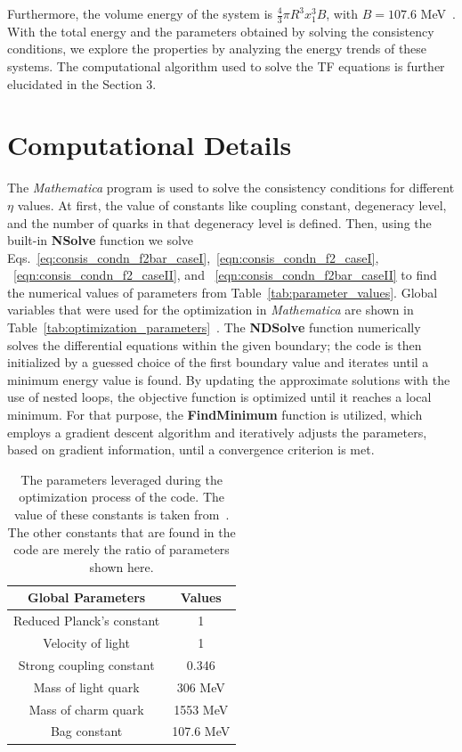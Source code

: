 \documentclass[final,3p,times,twocolumn]{elsarticle}
\begin{document}
        Furthermore, the volume energy of the system is $\frac{4}{3} \pi R^{3} x_{1}^3 B$, with $B = 107.6$ MeV~\cite{Baral:2019qpl}. With the total energy and the parameters obtained by solving the consistency conditions, we explore the properties by analyzing the energy trends of these systems. The computational algorithm used to solve the TF equations is further
        elucidated in the Section 3.
        
\section{Computational Details}
    \label{sec:computational_details}
        The {\it Mathematica} program is used to solve the consistency conditions for different $\eta$ values. At first, the value of constants like coupling constant, degeneracy level, and the number of quarks in that degeneracy level is defined. Then,  using the built-in \textbf{NSolve} function we solve Eqs.~\eqref{eq:consis_condn_f2bar_caseI},~\eqref{eqn:consis_condn_f2_caseI}, ~\eqref{eqn:consis_condn_f2_caseII}, and ~\eqref{eqn:consis_condn_f2bar_caseII} to find the numerical values of parameters from Table~\eqref{tab:parameter_values}. Global variables that were used for the optimization in {\it Mathematica} are shown in Table~\eqref{tab:optimization_parameters}~\cite{Baral:2019qpl}.
       The \textbf{NDSolve} function numerically solves the differential equations within the given boundary; the code is then initialized by a guessed choice of the first boundary value and iterates until a minimum energy value is found. By updating the approximate solutions with the use of nested loops, the objective function is optimized until it reaches a local minimum. For that purpose, the \textbf{FindMinimum} function is utilized, which employs a gradient descent algorithm and iteratively adjusts the parameters, based on gradient information, until a convergence criterion is met. 
        \begin{table}
    \centering
    \caption{The parameters leveraged during the optimization process of the code. The value of these constants is taken from~\cite{Baral:2019qpl}. The other constants that are found in the code are merely the ratio of parameters shown here.}
             \begin{tabular}{c c  }
                        \hline
                        Global Parameters & Values  \\
                        \hline
                        Reduced Planck's constant & 1 \\
                        Velocity of light & 1 \\
                        Strong coupling constant & 0.346 \\
                        Mass of light quark & 306 MeV \\
                        Mass of charm quark & 1553 MeV \\
                        Bag constant & 107.6 MeV \\
                        \hline
                        \end{tabular}
                \label{tab:optimization_parameters}        
                \end{table}
\end{document}
